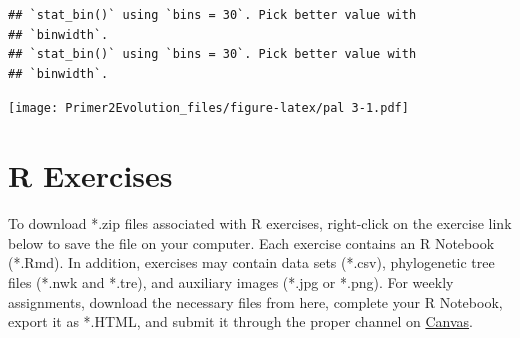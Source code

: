 \documentclass[
]{book}
\begin{document}
\begin{verbatim}
## `stat_bin()` using `bins = 30`. Pick better value with
## `binwidth`.
## `stat_bin()` using `bins = 30`. Pick better value with
## `binwidth`.
\end{verbatim}

\texttt{[image: Primer2Evolution\_files/figure-latex/pal 3-1.pdf]}

\hypertarget{r-exercises}{%
\chapter{R Exercises}\label{r-exercises}}

To download *.zip files associated with R exercises, right-click on the exercise link below to save the file on your computer. Each exercise contains an R Notebook (*.Rmd). In addition, exercises may contain data sets (*.csv), phylogenetic tree files (*.nwk and *.tre), and auxiliary images (*.jpg or *.png). For weekly assignments, download the necessary files from here, complete your R Notebook, export it as *.HTML, and submit it through the proper channel on \href{https://k-state.instructure.com/}{Canvas}.
\end{document}
